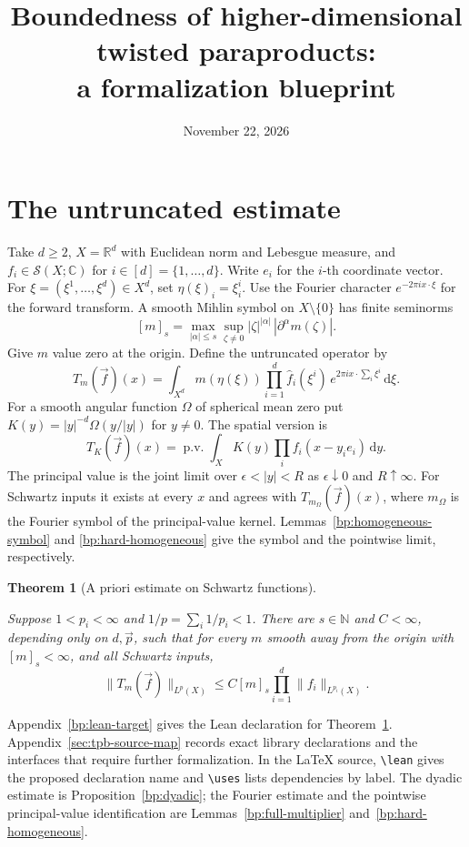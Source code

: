 \documentclass[11pt,letterpaper]{article}
\title{Boundedness of higher-dimensional twisted paraproducts:\\a formalization blueprint}
\author{}
\date{November 22, 2026}
\newtheorem{theorem}{Theorem}[section]
\theoremstyle{definition}
\newcommand{\R}{\mathbb R}
\newcommand{\C}{\mathbb C}
\newcommand{\dd}{\,\mathrm d}
\newcommand{\norm}[1]{\lVert#1\rVert}
\newcommand{\Sch}{\mathcal S}
\providecommand{\lean}[1]{}
\providecommand{\uses}[1]{}
\begin{document}
\maketitle

\section{The untruncated estimate}
Take \(d\ge2\), \(X=\R^d\) with Euclidean norm and Lebesgue measure,
and \(f_i\in\Sch(X;\C)\) for \(i\in[d]=\{1,\ldots,d\}\). Write
\(e_i\) for the \(i\)-th coordinate vector. For
\(\xi=(\xi^1,\ldots,\xi^d)\in X^d\), set
\(\eta(\xi)_i=\xi^i_i\). Use the Fourier character
\(e^{-2\pi i x\cdot\xi}\) for the forward transform. A smooth Mihlin
symbol on \(X\setminus\{0\}\) has finite seminorms
\[
 [m]_s=\max_{|\alpha|\le s}\sup_{\zeta\ne0}
            |\zeta|^{|\alpha|}\,|\partial^\alpha m(\zeta)|.
\]
Give \(m\) value zero at the origin. Define the untruncated operator by
\begin{equation}\label{bp:op}
 T_m(\vec f)(x)=\int_{X^d}m(\eta(\xi))
    \prod_{i=1}^d\widehat f_i(\xi^i)\,
    e^{2\pi i x\cdot\sum_i\xi^i}\dd\xi .
\end{equation}
For a smooth angular function \(\Omega\) of spherical mean zero put
\(K(y)=|y|^{-d}\Omega(y/|y|)\) for \(y\ne0\). The spatial version is
\[
 T_K(\vec f)(x)=\operatorname{p.v.}\int_X K(y)
                              \prod_i f_i(x-y_i e_i)\dd y .
\]
The principal value is the joint limit over \(\epsilon<|y|<R\)
as \(\epsilon\downarrow0\) and \(R\uparrow\infty\). For Schwartz inputs
it exists at every \(x\) and agrees with \(T_{m_\Omega}(\vec f)(x)\),
where \(m_\Omega\) is the Fourier symbol of the principal-value kernel.
Lemmas~\ref{bp:homogeneous-symbol} and \ref{bp:hard-homogeneous}
give the symbol and the pointwise limit, respectively.

\begin{theorem}[A priori estimate on Schwartz functions]\label{bp:main}
\lean{Auto.main_result}
\uses{bp:frechet,bp:full-multiplier}
Suppose \(1<p_i<\infty\) and \(1/p=\sum_i1/p_i<1\).
There are \(s\in\mathbb N\) and \(C<\infty\), depending only on
\(d,\vec p\), such that for every \(m\) smooth away from the origin
with \([m]_s<\infty\), and all Schwartz inputs,
\[
                \norm{T_m(\vec f)}_{L^p(X)}
                \le C[m]_s\prod_{i=1}^d\norm{f_i}_{L^{p_i}(X)} .
\]
\end{theorem}

Appendix~\ref{bp:lean-target} gives the Lean declaration for
Theorem~\ref{bp:main}.
Appendix~\ref{sec:tpb-source-map} records exact library declarations
and the interfaces that require further formalization.
In the \LaTeX{} source, \verb|\lean| gives the proposed declaration name
and \verb|\uses| lists dependencies by label. The dyadic estimate is
Proposition~\ref{bp:dyadic}; the Fourier estimate and the pointwise
principal-value identification are Lemmas~\ref{bp:full-multiplier}
and~\ref{bp:hard-homogeneous}.
\end{document}
